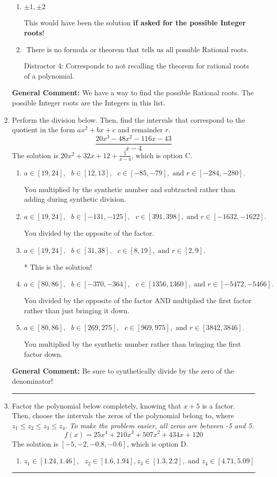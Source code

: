\documentclass{extbook}[14pt]
\newcommand{\litem}[1]{\item #1

\rule{\textwidth}{0.4pt}}
\begin{document}
\begin{enumerate}
{\begin{enumerate}[label=\Alph*.]
 Distractor 1: Corresponds to the plus or minus factors of a1 only.
\item \( \pm 1,\pm 2 \)

This would have been the solution \textbf{if asked for the possible Integer roots}!
\item \( \text{ There is no formula or theorem that tells us all possible Rational roots.} \)

 Distractor 4: Corresponds to not recalling the theorem for rational roots of a polynomial.
\end{enumerate}

\textbf{General Comment:} We have a way to find the possible Rational roots. The possible Integer roots are the Integers in this list.
}
\litem{
Perform the division below. Then, find the intervals that correspond to the quotient in the form $ax^2+bx+c$ and remainder $r$.
\[ \frac{20x^{3} -48 x^{2} -116 x -43}{x -4} \]The solution is \( 20x^{2} +32 x + 12 + \frac{5}{x -4} \), which is option C.\begin{enumerate}[label=\Alph*.]
\item \( a \in [19, 24], \text{   } b \in [12, 13], \text{   } c \in [-85, -79], \text{   and   } r \in [-284, -280]. \)

 You multiplied by the synthetic number and subtracted rather than adding during synthetic division.
\item \( a \in [19, 24], \text{   } b \in [-131, -125], \text{   } c \in [391, 398], \text{   and   } r \in [-1632, -1622]. \)

 You divided by the opposite of the factor.
\item \( a \in [19, 24], \text{   } b \in [31, 38], \text{   } c \in [8, 19], \text{   and   } r \in [2, 9]. \)

* This is the solution!
\item \( a \in [80, 86], \text{   } b \in [-370, -364], \text{   } c \in [1356, 1360], \text{   and   } r \in [-5472, -5466]. \)

 You divided by the opposite of the factor AND multiplied the first factor rather than just bringing it down.
\item \( a \in [80, 86], \text{   } b \in [269, 275], \text{   } c \in [969, 975], \text{   and   } r \in [3842, 3846]. \)

 You multiplied by the synthetic number rather than bringing the first factor down.
\end{enumerate}

\textbf{General Comment:} Be sure to synthetically divide by the zero of the denominator!
}
\litem{
Factor the polynomial below completely, knowing that $x + 5$ is a factor. Then, choose the intervals the zeros of the polynomial belong to, where $z_1 \leq z_2 \leq z_3 \leq z_4$. \textit{To make the problem easier, all zeros are between -5 and 5.}
\[ f(x) = 25x^{4} +210 x^{3} +507 x^{2} +434 x + 120 \]The solution is \( [-5, -2, -0.8, -0.6] \), which is option D.\begin{enumerate}[label=\Alph*.]
\item \( z_1 \in [1.24, 1.46], \text{   }  z_2 \in [1.6, 1.94], z_3 \in [1.3, 2.2], \text{   and   } z_4 \in [4.71, 5.09] \)


\end{enumerate}}
\end{enumerate}
\end{document}
